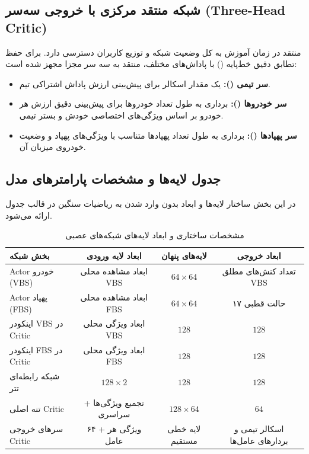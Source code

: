 \documentclass[a4paper,12pt,oneside]{report}
\begin{document}
\subsection{شبکه منتقد مرکزی با خروجی سه‌سر (Three-Head Critic)}
منتقد در زمان آموزش به کل وضعیت شبکه و توزیع کاربران دسترسی دارد. برای حفظ تطابق دقیق خط‌پایه () با پاداش‌های مختلف، منتقد به سه سر مجزا مجهز شده است:
\begin{itemize}
    \item \textbf{سر تیمی ():} یک مقدار اسکالر برای پیش‌بینی ارزش پاداش اشتراکی تیم.
    \item \textbf{سر خودروها ():} برداری به طول تعداد خودروها برای پیش‌بینی دقیق ارزش هر خودرو بر اساس ویژگی‌های اختصاصی خودش و بستر تیمی.
    \item \textbf{سر پهپادها ():} برداری به طول تعداد پهپادها متناسب با ویژگی‌های پهپاد و وضعیت خودروی میزبان آن.
\end{itemize}

\subsection{جدول لایه‌ها و مشخصات پارامترهای مدل}
در این بخش ساختار لایه‌ها و ابعاد بدون وارد شدن به ریاضیات سنگین در قالب جدول ارائه می‌شود.

\begin{table}[H]
    \centering
    \caption{مشخصات ساختاری و ابعاد لایه‌های شبکه‌های عصبی}
    \label{tab:network_parameters}
    \begin{tabular}{lccc}
        \toprule
        \textbf{بخش شبکه} & \textbf{ابعاد لایه ورودی} & \textbf{لایه‌های پنهان} & \textbf{ابعاد خروجی} \\
        \midrule
        Actor خودرو (VBS) & ابعاد مشاهده محلی VBS & $64 \times 64$ & تعداد کنش‌های مطلق VBS \\
        Actor پهپاد (FBS) & ابعاد مشاهده محلی FBS & $64 \times 64$ & ۱۷ حالت قطبی \\
        اینکودر VBS در Critic & ابعاد ویژگی محلی VBS & $128$ & $128$ \\
        اینکودر FBS در Critic & ابعاد ویژگی محلی FBS & $128$ & $128$ \\
        شبکه رابطه‌ای تتر & $128 \times 2$ & $128$ & $128$ \\
        تنه اصلی Critic & تجمیع ویژگی‌ها + سراسری & $128 \times 64$ & $64$ \\
        سرهای خروجی Critic & ۶۴ + ویژگی هر عامل & لایه خطی مستقیم & اسکالر تیمی و بردارهای عامل‌ها \\
        \bottomrule
    \end{tabular}
\end{table}
\end{document}
